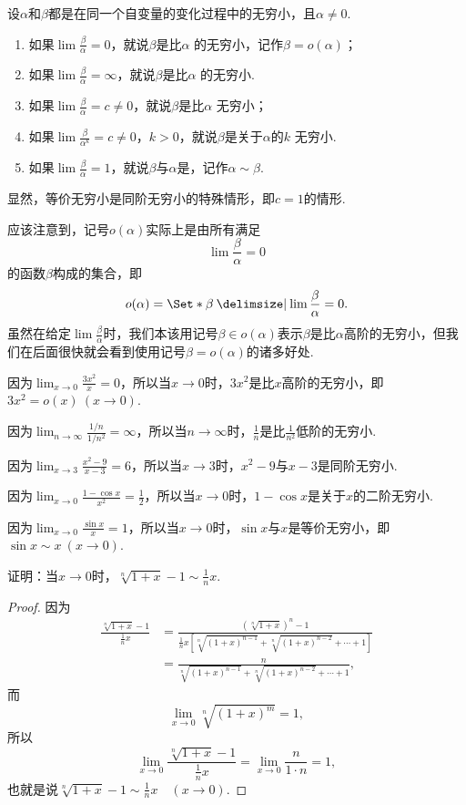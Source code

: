 \begin{definition}
\newcommand{\lf}[1][]{\lim \frac{\beta}{\alpha^{#1}}}
设\(\alpha\)和\(\beta\)都是在同一个自变量的变化过程中的无穷小，且\(\alpha\neq0\).
\begin{enumerate}
\item 如果\(\lf=0\)，就说\(\beta\)是比\(\alpha\) 的无穷小，记作\(\beta=o(\alpha)\)；
\item 如果\(\lf=\infty\)，就说\(\beta\)是比\(\alpha\) 的无穷小.
\item 如果\(\lf=c\neq0\)，就说\(\beta\)是比\(\alpha\) 无穷小；
\item 如果\(\lf[k]=c\neq0\)，\(k>0\)，就说\(\beta\)是关于\(\alpha\)的\(k\) 无穷小.
\item 如果\(\lf=1\)，就说\(\beta\)与\(\alpha\)是，记作\(\alpha\sim\beta\).
\end{enumerate}
\end{definition}
显然，等价无穷小是同阶无穷小的特殊情形，即\(c=1\)的情形.

应该注意到，记号\(o(\alpha)\)实际上是由所有满足\[
\lim \frac{\beta}{\alpha} = 0
\]的函数\(\beta\)构成的集合，即\[
o(\alpha) = \Set*{ \beta \given \lim \frac{\beta}{\alpha} = 0 }.
\]虽然在给定\(\lim \frac{\beta}{\alpha}\)时，我们本该用记号\(\beta \in o(\alpha)\)表示\(\beta\)是比\(\alpha\)高阶的无穷小，但我们在后面很快就会看到使用记号\(\beta = o(\alpha)\)的诸多好处.

\begin{example}
因为\(\lim_{x\to0} \frac{3x^2}{x} = 0\)，所以当\(x\to0\)时，\(3x^2\)是比\(x\)高阶的无穷小，即\(3x^2 = o(x)\ (x\to0)\).

因为\(\lim_{n\to\infty} \frac{1/n}{1/n^2} = \infty\)，所以当\(n\to\infty\)时，\(\frac{1}{n}\)是比\(\frac{1}{n^2}\)低阶的无穷小.

因为\(\lim_{x\to3} \frac{x^2-9}{x-3} = 6\)，所以当\(x\to3\)时，\(x^2-9\)与\(x-3\)是同阶无穷小.

因为\(\lim_{x\to0} \frac{1-\cos x}{x^2} = \frac{1}{2}\)，所以当\(x\to0\)时，\(1-\cos x\)是关于\(x\)的二阶无穷小.

因为\(\lim_{x\to0} \frac{\sin x}{x} = 1\)，所以当\(x\to0\)时，\(\sin x\)与\(x\)是等价无穷小，即\(\sin x \sim x\ (x\to0)\).
\end{example}

\begin{example}
证明：当\(x\to0\)时，\(\sqrt[n]{1+x} - 1 \sim \frac{1}{n} x\).
\begin{proof}
因为\begin{align*}
\frac{\sqrt[n]{1+x} - 1}{\frac{1}{n} x}
&= \frac{(\sqrt[n]{1+x})^n - 1}{\frac{1}{n} x \left[ \sqrt[n]{(1+x)^{n-1}} + \sqrt[n]{(1+x)^{n-2}} + \dotsb + 1 \right]} \\
&= \frac{n}{\sqrt[n]{(1+x)^{n-1}} + \sqrt[n]{(1+x)^{n-2}} + \dotsb + 1},
\end{align*}
而\[
\lim_{x\to0} \sqrt[n]{(1+x)^m} = 1,
\]所以\[
\lim_{x\to0} \frac{\sqrt[n]{1+x} - 1}{\frac{1}{n} x} = \lim_{x\to0} \frac{n}{1 \cdot n} = 1,
\]也就是说\(\sqrt[n]{1+x} - 1 \sim \frac{1}{n} x \quad(x\to0)\).
\end{proof}
\end{example}

